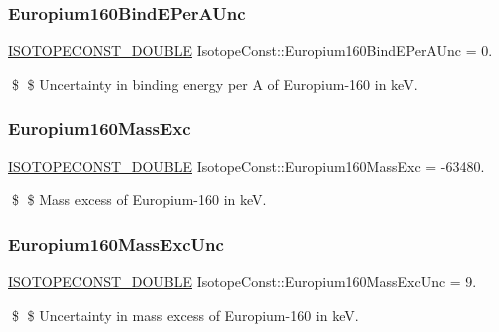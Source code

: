 \subsubsection{\texorpdfstring{Europium160\+Bind\+E\+Per\+A\+Unc}{Europium160BindEPerAUnc}}
{\footnotesize\ttfamily \mbox{\hyperlink{group___isotope_const-_macros_ga8f45a7272ce02c0b4c65c44636ed719a}{I\+S\+O\+T\+O\+P\+E\+C\+O\+N\+S\+T\+\_\+\+D\+O\+U\+B\+LE}} Isotope\+Const\+::\+Europium160\+Bind\+E\+Per\+A\+Unc = 0.}

\$ \$ Uncertainty in binding energy per A of Europium-\/160 in keV. \mbox{\label{group___isotope_const-_europium-_eu160_gad73266ce5477ea98d54b1948aa5d7c52}} 
\subsubsection{\texorpdfstring{Europium160\+Mass\+Exc}{Europium160MassExc}}
{\footnotesize\ttfamily \mbox{\hyperlink{group___isotope_const-_macros_ga8f45a7272ce02c0b4c65c44636ed719a}{I\+S\+O\+T\+O\+P\+E\+C\+O\+N\+S\+T\+\_\+\+D\+O\+U\+B\+LE}} Isotope\+Const\+::\+Europium160\+Mass\+Exc = -\/63480.}

\$ \$ Mass excess of Europium-\/160 in keV. \mbox{\label{group___isotope_const-_europium-_eu160_ga6cf6d4423a75133d5915aa6b0a19ddfb}} 
\subsubsection{\texorpdfstring{Europium160\+Mass\+Exc\+Unc}{Europium160MassExcUnc}}
{\footnotesize\ttfamily \mbox{\hyperlink{group___isotope_const-_macros_ga8f45a7272ce02c0b4c65c44636ed719a}{I\+S\+O\+T\+O\+P\+E\+C\+O\+N\+S\+T\+\_\+\+D\+O\+U\+B\+LE}} Isotope\+Const\+::\+Europium160\+Mass\+Exc\+Unc = 9.}

\$ \$ Uncertainty in mass excess of Europium-\/160 in keV. \mbox{\label{group___isotope_const-_europium-_eu160_ga140d065efbaf07a8faa67bf0ef583b1e}} 
